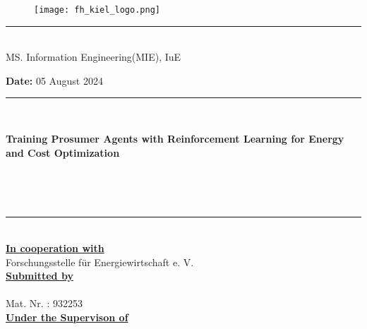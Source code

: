 \documentclass[]{report} %
\begin{document}
\pagestyle{empty}
\frontmatter %

\begin{titlepage}
	\begin{center}
		\vfill
		
		
		\begin{figure}[h]
			\centering \texttt{[image: fh\_kiel\_logo.png]}
		\end{figure}
		\rule{\textwidth}{1pt}\\[0cm]
		
		\center \huge{MS. Information Engineering(MIE), IuE}
		
		\vspace*{1.5\baselineskip}
		
		\center \Large{ \textbf{Date:} 05 August 2024}\\[1.0cm]
		
		\rule{\textwidth}{0.5pt}\\[0cm]
		{\huge \bfseries {Training Prosumer Agents with Reinforcement Learning for Energy and Cost Optimization } \par \ }\\[-0.5cm]
		\rule{\textwidth}{1.5pt}\\[1cm]
		
		\center \Large{ \textbf{\underline{In cooperation with}} \\[0.3cm] Forschungsstelle für Energiewirtschaft e. V.}\\[1.5cm]
		
		\hfill \large \textbf{\underline{Submitted by}}\\[0.3cm] \hfill
		\hfill  {\large {}}\\ [0.1cm]
		\hfill  {\large{Mat. Nr. : 932253}}\\ [1.5cm]
		
		\hfill \large \textbf{\underline{Under the Supervison of}}\\[0.3cm]
		\hfill  {\large {}}\\ [0.1cm]
		\hfill  {\large {}}\\ [0.1cm]
		
		
	\end{center}
\end{titlepage}
\end{document}
